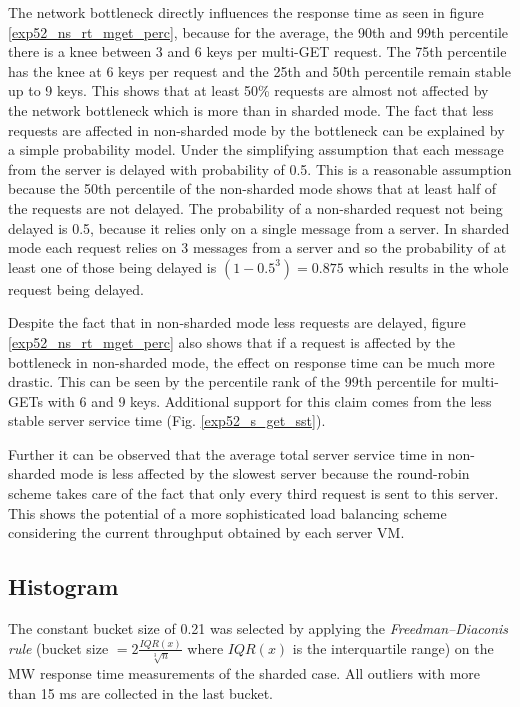 \documentclass[report.tex]{subfiles}
\begin{document}
The network bottleneck directly influences the response time as seen in figure \ref{exp52_ns_rt_mget_perc}, because for the average, the 90th and 99th percentile there is a knee between 3 and 6 keys per multi-GET request. The 75th percentile has the knee at 6 keys per request and the 25th and 50th percentile remain stable up to 9 keys. This shows that at least 50\% requests are almost not affected by the network bottleneck which is more than in sharded mode. The fact that less requests are affected in non-sharded mode by the bottleneck can be explained by a simple probability model.
Under the simplifying assumption that each message from the server is delayed with probability of 0.5. This is a reasonable assumption because the 50th percentile of the non-sharded mode shows that at least half of the requests are not delayed.
The probability of a non-sharded request not being delayed is 0.5, because it relies only on a single message from a server.
In sharded mode each request relies on 3 messages from a server and so the probability of at least one of those being delayed is $(1-0.5^3)=0.875$ which results in the whole request being delayed.

Despite the fact that in non-sharded mode less requests are delayed, figure \ref{exp52_ns_rt_mget_perc} also shows that if a request is affected by the bottleneck in non-sharded mode, the effect on response time can be much more drastic. This can be seen by the percentile rank of the 99th percentile for multi-GETs with 6 and 9 keys. Additional support for this claim comes from the less stable server service time (Fig. \ref{exp52_s_get_sst}).

Further it can be observed that the average total server service time in non-sharded mode is less affected by the slowest server because the round-robin scheme takes care of the fact that only every third request is sent to this server. This shows the potential of a more sophisticated load balancing scheme considering the current throughput obtained by each server VM.


\subsection{Histogram}


The constant bucket size of 0.21 was selected by applying the \emph{Freedman–Diaconis rule} (bucket size $ = 2 \frac{IQR(x)}{\sqrt[3]{n}}$ where $IQR(x)$ is the interquartile range) on the MW response time measurements of the sharded case. All outliers with more than 15 ms are collected in the last bucket.
\end{document}
